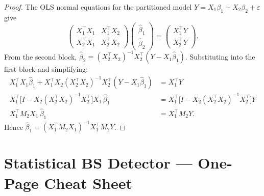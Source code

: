\documentclass[11pt,a4paper]{article}
\theoremstyle{definition}
\theoremstyle{plain}
\theoremstyle{remark}
\newcommand{\bhat}{\hat{\beta}}
\begin{document}
\begin{proof}
The OLS normal equations for the partitioned model $Y = X_1\beta_1 + X_2\beta_2 + \varepsilon$ give
\[
  \begin{pmatrix} X_1^\top X_1 & X_1^\top X_2 \\ X_2^\top X_1 & X_2^\top X_2 \end{pmatrix}
  \begin{pmatrix} \bhat_1 \\ \bhat_2 \end{pmatrix}
  =
  \begin{pmatrix} X_1^\top Y \\ X_2^\top Y \end{pmatrix}.
\]
From the second block, $\bhat_2 = (X_2^\top X_2)^{-1} X_2^\top (Y - X_1 \bhat_1)$.
Substituting into the first block and simplifying:
\begin{align*}
  X_1^\top X_1 \bhat_1 + X_1^\top X_2 (X_2^\top X_2)^{-1} X_2^\top(Y - X_1\bhat_1) &= X_1^\top Y \\
  X_1^\top\!\big[I - X_2(X_2^\top X_2)^{-1} X_2^\top\big] X_1\, \bhat_1 &= X_1^\top\!\big[I - X_2(X_2^\top X_2)^{-1} X_2^\top\big] Y \\
  X_1^\top M_2 X_1\, \bhat_1 &= X_1^\top M_2 Y.
\end{align*}
Hence $\bhat_1 = (X_1^\top M_2 X_1)^{-1} X_1^\top M_2 Y$.
\end{proof}

\section{Statistical BS Detector --- One-Page Cheat Sheet}\label{app:bsdetector}
\end{document}
